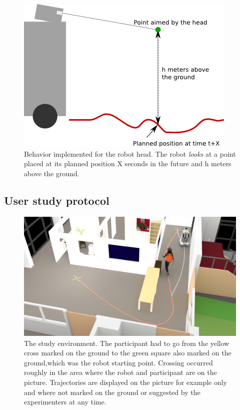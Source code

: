 \documentclass[a4paper,11pt,twoside]{StyleThese}
\begin{document}
\begin{figure}[hbtp]
\centering
\includegraphics[scale=0.7]{figures/chapter2/head_traj_follower.png}
\caption{Behavior implemented for the robot head. The robot \textit{looks} at a point placed at its planned position X seconds in the future and h meters above the ground.}
\label{experiment_adream}
\end{figure}

\subsection{User study protocol}

\begin{figure}[hbtp]
\centering
\includegraphics[width=\textwidth]{figures/chapter2/expe_human-min.png}
\caption{The  study  environment.  The  participant  had  to  go  from  the  yellow  cross  marked  on  the  ground  to  the  green  square  also  marked  on  the  ground,which was the robot starting point. Crossing occurred roughly in the area where the robot and participant are on the picture. Trajectories are displayed on the picture for example only and where not marked on the ground or suggested by the experimenters at any time.}
\label{head_gaze_behavior}
\end{figure}
\end{document}
